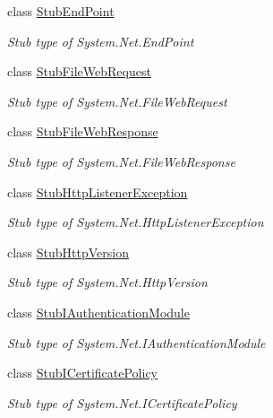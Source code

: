 \begin{DoxyCompactItemize}
class \hyperlink{class_system_1_1_net_1_1_fakes_1_1_stub_end_point}{Stub\-End\-Point}
\begin{DoxyCompactList}\small\item\em Stub type of System.\-Net.\-End\-Point\end{DoxyCompactList}\item 
class \hyperlink{class_system_1_1_net_1_1_fakes_1_1_stub_file_web_request}{Stub\-File\-Web\-Request}
\begin{DoxyCompactList}\small\item\em Stub type of System.\-Net.\-File\-Web\-Request\end{DoxyCompactList}\item 
class \hyperlink{class_system_1_1_net_1_1_fakes_1_1_stub_file_web_response}{Stub\-File\-Web\-Response}
\begin{DoxyCompactList}\small\item\em Stub type of System.\-Net.\-File\-Web\-Response\end{DoxyCompactList}\item 
class \hyperlink{class_system_1_1_net_1_1_fakes_1_1_stub_http_listener_exception}{Stub\-Http\-Listener\-Exception}
\begin{DoxyCompactList}\small\item\em Stub type of System.\-Net.\-Http\-Listener\-Exception\end{DoxyCompactList}\item 
class \hyperlink{class_system_1_1_net_1_1_fakes_1_1_stub_http_version}{Stub\-Http\-Version}
\begin{DoxyCompactList}\small\item\em Stub type of System.\-Net.\-Http\-Version\end{DoxyCompactList}\item 
class \hyperlink{class_system_1_1_net_1_1_fakes_1_1_stub_i_authentication_module}{Stub\-I\-Authentication\-Module}
\begin{DoxyCompactList}\small\item\em Stub type of System.\-Net.\-I\-Authentication\-Module\end{DoxyCompactList}\item 
class \hyperlink{class_system_1_1_net_1_1_fakes_1_1_stub_i_certificate_policy}{Stub\-I\-Certificate\-Policy}
\begin{DoxyCompactList}\small\item\em Stub type of System.\-Net.\-I\-Certificate\-Policy\end{DoxyCompactList}\item 

\end{DoxyCompactItemize}
